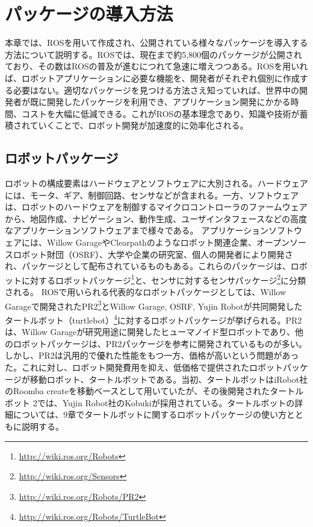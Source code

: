 
\chapter{パッケージの導入方法}

本章では、ROSを用いて作成され、公開されている様々なパッケージを導入する方法について説明する。ROSでは、現在まで約5,800個のパッケージが公開されており、その数はROSの普及が進むにつれて急速に増えつつある。ROSを用いれば、ロボットアプリケーションに必要な機能を、開発者がそれぞれ個別に作成する必要はない。適切なパッケージを見つける方法さえ知っていれば、世界中の開発者が既に開発したパッケージを利用でき、アプリケーション開発にかかる時間、コストを大幅に低減できる。これがROSの基本理念であり、知識や技術が蓄積されていくことで、ロボット開発が加速度的に効率化される。

\section{ロボットパッケージ}

ロボットの構成要素はハードウェアとソフトウェアに大別される。ハードウェアには、モータ、ギア、制御回路、センサなどが含まれる。一方、ソフトウェアは、ロボットのハードウェアを制御するマイクロコントローラのファームウェアから、地図作成、ナビゲーション、動作生成、ユーザインタフェースなどの高度なアプリケーションソフトウェアまで様々である。
アプリケーションソフトウェアには、Willow GarageやClearpathのようなロボット関連企業、オープンソースロボット財団（OSRF）、大学や企業の研究室、個人の開発者により開発され、パッケージとして配布されているものもある。これらのパッケージは、ロボットに対するロボットパッケージ\footnote{\url{http://wiki.ros.org/Robots}}と、センサに対するセンサパッケージ\footnote{\url{http://wiki.ros.org/Sensors}}に分類される。
ROSで用いられる代表的なロボットパッケージとしては、Willow Garageで開発されたPR2\footnote{\url{http://wiki.ros.org/Robots/PR2}}とWillow Garage, OSRF, Yujin Robotが共同開発したタートルボット（turtlebot）\footnote{\url{http://wiki.ros.org/Robots/TurtleBot}}に対するロボットパッケージが挙げられる。PR2は、Willow Garageが研究用途に開発したヒューマノイド型ロボットであり、他のロボットパッケージは、PR2パッケージを参考に開発されているものが多い。しかし、PR2は汎用的で優れた性能をもつ一方、価格が高いという問題があった。これに対し、ロボット開発費用を抑え、低価格で提供されたロボットパッケージが移動ロボット、タートルボットである。当初、タートルボットはiRobot社のRoomba createを移動ベースとして用いていたが、その後開発されたタートルボット 2では、Yujin Robot社のKobukiが採用されている。タートルボットの詳細については、9章でタートルボットに関するロボットパッケージの使い方とともに説明する。


